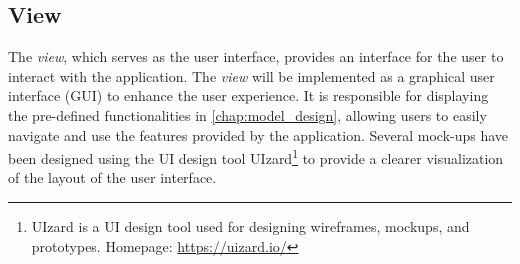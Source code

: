 \subsection{View}
\label{chap:view_design}
The \emph{view}, which serves as the user interface, provides an interface for the user to interact with the application. The \emph{view} will be implemented as a graphical user interface (GUI) to enhance the user experience. 
It is responsible for displaying the pre-defined functionalities in \autoref{chap:model_design}, allowing users to easily navigate and use the features provided by the application. 
Several mock-ups have been designed using the UI design tool UIzard\footnote{UIzard is a UI design tool used for designing wireframes, mockups, and prototypes. Homepage: \url{https://uizard.io/}} to provide a clearer visualization of the layout of the user interface.

